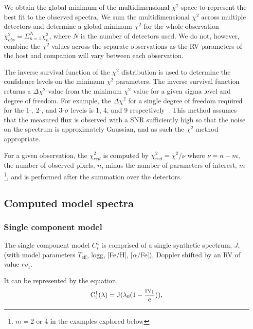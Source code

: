 \documentclass[fleqn,usenatbib]{mnras}
\begin{document}
    We obtain the global minimum of the multidimensional \(\chi^{2}\)-space to represent the best fit to the observed spectra. We sum the multidimensional \(\chi^{2}\) across multiple detectors and determine a global minimum \(\chi^{2}\) for the whole observation \(\chi^{2}_{obs} = \Sigma^{N}_{n=1} \chi^{2}_n\), where \(N\) is the number of detectors used. We do not, however, combine the \(\chi^{2}\) values across the separate observations as the RV parameters of the host and companion will vary between each observation.
    
    The inverse survival function of the \(\chi^2\) distribution is used to determine the confidence levels on the minimum \(\chi^2\) parameters. The inverse survival function returns a \(\Delta\chi^2\) value from the minimum \(\chi^2\) value for a given sigma level and degree of freedom.
    For example, the \(\Delta \chi^2\) for a single degree of freedom required for the 1-, 2-, and 3-\(\sigma\) levels is 1, 4, and 9 respectively~\citep{bevington_data_2003}. This method assumes that the measured flux is observed with a SNR sufficiently high so that the noise on the spectrum is approximately Gaussian, and as such the \(\chi^2\) method appropriate.
    
    For a given observation, the \(\chi^{2}_{red}\) is computed by \(\chi^2_{red} = \chi^2 / \nu\) where \(\nu = n - m\), the number of observed pixels, \(n\), minus the number of parameters of interest, \(m\)\footnote{\(m=2\) or 4 in the examples explored below}, and is performed after the summation over the detectors.
    
    \subsection{Computed model spectra}
    \label{models}
    \subsubsection{Single component model}
    \label{subsubsec:single-model}
    The single component model \(C^{1}_{i}\) is comprised of a single synthetic spectrum, \(J\), (with model parameters \(T_{\textrm{eff}}\), logg, [Fe/H], [\(\alpha\)/Fe]), Doppler shifted by an RV of value \({rv}_1\).
    
    It can be represented by the equation, 
    \begin{equation}
    \rm C^{1}_{i}(\lambda) = J(\lambda_0(1-\frac{{rv}_1}{c})),
    \end{equation}
    
\end{document}
